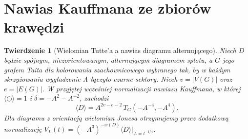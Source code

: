 \documentclass[11pt,a4paper]{report}
\numberwithin{equation}{section}
\theoremstyle{plain}
\newtheorem{twierdzenie}{Twierdzenie}[section]
\theoremstyle{definition}
\theoremstyle{remark}
\begin{document}
\begin{center}
\end{center}

\section{Nawias Kauffmana ze zbiorów krawędzi}
\label{sec:tg-tait-tutte}

\begin{twierdzenie}[Wielomian Tutte'a a nawias diagramu alternującego]
\label{thm:tg-tait-tutte}
Niech $D$ będzie spójnym, niezorientowanym, alternującym
diagramem splotu, a $G$ jego grafem Taita dla kolorowania
szachownicowego wybranego tak, by w każdym skrzyżowaniu
wygładzenie A łączyło czarne sektory. Niech
$v=|V(G)|$ oraz $e=|E(G)|$. W przyjętej wcześniej
normalizacji nawiasu Kauffmana, w której
$\langle\bigcirc\rangle=1$ i
$\delta=-A^2-A^{-2}$, zachodzi
\[
\langle D\rangle
=A^{2v-e-2}\,T_G(-A^{-4},-A^4).
\]
Dla diagramu z orientacją wielomian Jonesa otrzymujemy
przez dodatkową normalizację
$V_L(t)=(-A^3)^{-w(D)}\langle D\rangle\big|_{A=t^{-1/4}}$.
\end{twierdzenie}
\end{document}

